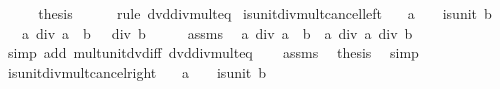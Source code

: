 \begin{isabellebody}
\ \ \isamarkupfalse%
\ \isamarkupfalse%
\ {\isacharquery}{\kern0pt}thesis\isanewline
\ \ \ \ \isamarkupfalse%
\ {\isacharparenleft}{\kern0pt}rule\ dvd{\isacharunderscore}{\kern0pt}div{\isacharunderscore}{\kern0pt}mult{}{\isacharunderscore}{\kern0pt}eq{\isacharparenright}{\kern0pt}\isanewline
{}\isamarkupfalse%
%
\endisatagproof
{\isafoldproof}%
%
\isadelimproof
\isanewline
%
\endisadelimproof
\isanewline
{}\isamarkupfalse%
\ is{\isacharunderscore}{\kern0pt}unit{\isacharunderscore}{\kern0pt}div{\isacharunderscore}{\kern0pt}mult{\isacharunderscore}{\kern0pt}cancel{\isacharunderscore}{\kern0pt}left{\isacharcolon}{\kern0pt}\isanewline
\ \ \ {\isachardoublequoteopen}a\ {\isasymnoteq}\ {}{\isachardoublequoteclose}\ \ {\isachardoublequoteopen}is{\isacharunderscore}{\kern0pt}unit\ b{\isachardoublequoteclose}\isanewline
\ \ \ {\isachardoublequoteopen}a\ div\ {\isacharparenleft}{\kern0pt}a\ {\isacharasterisk}{\kern0pt}\ b{\isacharparenright}{\kern0pt}\ {\isacharequal}{\kern0pt}\ {}\ div\ b{\isachardoublequoteclose}\isanewline
%
\isadelimproof
%
\endisadelimproof
%
\isatagproof
{}\isamarkupfalse%
\ {\isacharminus}{\kern0pt}\isanewline
\ \ \isamarkupfalse%
\ assms\ \isamarkupfalse%
\ {\isachardoublequoteopen}a\ div\ {\isacharparenleft}{\kern0pt}a\ {\isacharasterisk}{\kern0pt}\ b{\isacharparenright}{\kern0pt}\ {\isacharequal}{\kern0pt}\ a\ div\ a\ div\ b{\isachardoublequoteclose}\isanewline
\ \ \ \ \isamarkupfalse%
\ {\isacharparenleft}{\kern0pt}simp\ add{\isacharcolon}{\kern0pt}\ mult{\isacharunderscore}{\kern0pt}unit{\isacharunderscore}{\kern0pt}dvd{\isacharunderscore}{\kern0pt}iff\ dvd{\isacharunderscore}{\kern0pt}div{\isacharunderscore}{\kern0pt}mult{}{\isacharunderscore}{\kern0pt}eq{\isacharparenright}{\kern0pt}\isanewline
\ \ \isamarkupfalse%
\ assms\ \isamarkupfalse%
\ {\isacharquery}{\kern0pt}thesis\ \isamarkupfalse%
\ simp\isanewline
{}\isamarkupfalse%
%
\endisatagproof
{\isafoldproof}%
%
\isadelimproof
\isanewline
%
\endisadelimproof
\isanewline
{}\isamarkupfalse%
\ is{\isacharunderscore}{\kern0pt}unit{\isacharunderscore}{\kern0pt}div{\isacharunderscore}{\kern0pt}mult{\isacharunderscore}{\kern0pt}cancel{\isacharunderscore}{\kern0pt}right{\isacharcolon}{\kern0pt}\isanewline
\ \ \ {\isachardoublequoteopen}a\ {\isasymnoteq}\ {}{\isachardoublequoteclose}\ \ {\isachardoublequoteopen}is{\isacharunderscore}{\kern0pt}unit\ b{\isachardoublequoteclose}\isanewline

\end{isabellebody}
